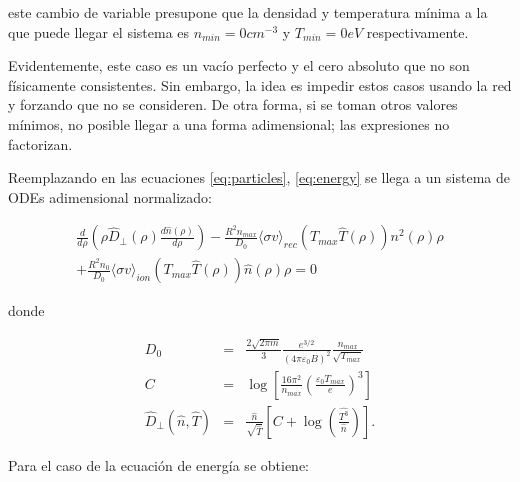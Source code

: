 este cambio de variable presupone que la densidad y temperatura mínima a la que puede llegar el sistema es $n_{min} = 0 cm^{-3}$ y $T_{min} = 0 eV$  respectivamente. 

Evidentemente, este caso es un vacío perfecto y el cero absoluto que no son físicamente consistentes. Sin embargo, la idea es impedir estos casos usando la red y forzando que no se consideren. De otra forma, si se toman otros valores mínimos, no posible llegar a una forma adimensional; las expresiones no factorizan. 

Reemplazando en las ecuaciones \eqref{eq:particles}, \eqref{eq:energy} se llega a un sistema de ODEs adimensional normalizado:

\begin{eqnarray}\label{eq:particlesnorm}
	\frac{d}{d\rho}\left(\rho\hat{D}_\perp(\rho) \frac{d\hat{n}(\rho)}{d\rho}\right) - \frac{R^2 n_{max}}{D_0}\langle\sigma v\rangle_{rec}( T_{max}\hat{T}(\rho) )n^2(\rho)\rho \nonumber\\
	+ \frac{R^2 n_0}{D_0}\langle\sigma v\rangle_{ion}(T_{max}\hat{T}(\rho))\hat{n}(\rho) \rho=0\quad
\end{eqnarray}

donde 

\begin{eqnarray}
	D_0 &=& \frac{2 \sqrt{2 \pi m}}{3}\frac{e^{3/2}}{(4\pi \varepsilon_0 B)^2}\frac{n_{max}}{\sqrt{T_{max}}} \\
	C &=&  \log{\left[\frac{16\pi^2}{n_{max}}\left(\frac{\varepsilon_0 T_{max}}{e}\right)^3\right]} \\
	\hat{D}_\perp(\hat{n},\hat{T}) &=& \frac{\hat{n}}{\sqrt{\hat{T}}} \left[ C + \log{\left(\frac{\hat{T^3}}{\hat{n}}\right)} \right].
\end{eqnarray}

Para el caso de la ecuación de energía se obtiene:

